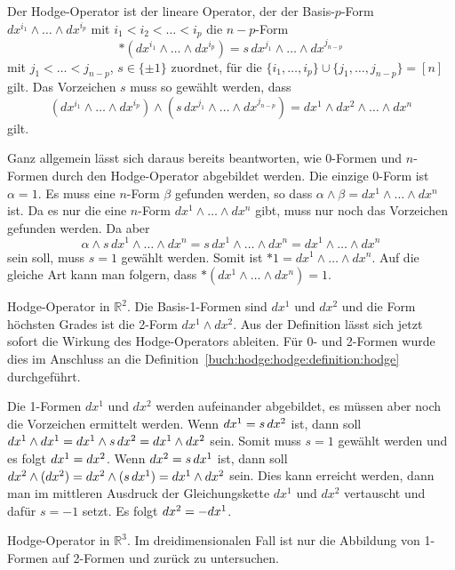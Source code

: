 \begin{definition}
\label{buch:hodge:hodge:definition:hodge}
Der Hodge-Operator ist der lineare Operator, der der
Basis-$p$-Form
$dx^{i_1}\wedge\dots\wedge dx^{i_p}$ mit $i_1<i_2<\dots<i_p$
die $n-p$-Form
\[
\ast(dx^{i_1}\wedge\dots\wedge dx^{i_p})
=
s\,dx^{j_1}\wedge\dots\wedge dx^{j_{n-p}}
\]
mit $j_1<\dots <j_{n-p}$, $s\in\{\pm1\}$ zuordnet, für die
$\{i_1,\dots,i_p\}\cup\{j_1,\dots,j_{n-p}\}=[n]$ gilt.
Das Vorzeichen $s$ muss so gewählt werden, dass
\[
(dx^{i_1}\wedge\dots\wedge dx^{i_p})
\wedge
(s\,dx^{j_1}\wedge\dots\wedge dx^{j_{n-p}})
=
dx^1\wedge dx^2\wedge\dots\wedge dx^n
\]
gilt.
\end{definition}

Ganz allgemein lässt sich daraus bereits beantworten, wie $0$-Formen und
$n$-Formen durch den Hodge-Operator abgebildet werden.
Die einzige 0-Form ist $\alpha=1$.
Es muss eine $n$-Form $\beta$ gefunden werden, so dass
$\alpha\wedge\beta=dx^1\wedge\dots\wedge dx^n$ ist.
Da es nur die eine $n$-Form $dx^1\wedge\dots\wedge dx^n$ gibt, muss
nur noch das Vorzeichen gefunden werden.
Da aber
\[
\alpha\wedge
s\,dx^1\wedge\dots\wedge dx^n
=
s\,dx^1\wedge\dots\wedge dx^n
=
dx^1\wedge\dots\wedge dx^n
\]
sein soll, muss $s=1$ gewählt werden.
Somit ist $\ast 1=dx^1\wedge\dots\wedge dx^n$.
Auf die gleiche Art kann man folgern, dass
$\ast(dx^1\wedge\dots\wedge dx^n)=1$.

\begin{beispiel}
Hodge-Operator in $\mathbb{R}^2$.
Die Basis-1-Formen sind $dx^1$ und $dx^2$ und die Form höchsten Grades ist
die 2-Form $dx^1\wedge dx^2$.
Aus der Definition lässt sich jetzt sofort die Wirkung des Hodge-Operators
ableiten.
Für 0- und 2-Formen wurde dies im Anschluss an die
Definition~\ref{buch:hodge:hodge:definition:hodge} durchgeführt.

Die 1-Formen $dx^1$ und $dx^2$ werden aufeinander abgebildet, es müssen
aber noch die Vorzeichen ermittelt werden.
Wenn $\*dx^1=s\,dx^2$ ist, dann soll
$dx^1\wedge \*dx^1=dx^1\wedge s\,dx^2=dx^1\wedge dx^2$ sein.
Somit muss $s=1$ gewählt werden und es folgt $\*dx^1=dx^2$.
Wenn $\*dx^2=s\,dx^1$ ist, dann soll
$dx^2\wedge(\*dx^2)=dx^2\wedge(s\,dx^1)=dx^1\wedge dx^2$ sein.
Dies kann erreicht werden, dann man im mittleren Ausdruck der
Gleichungskette $dx^1$ und $dx^2$ vertauscht und dafür $s=-1$ setzt.
Es folgt $\*dx^2=-dx^1$.
\end{beispiel}

\begin{beispiel}
\label{buch:hodge:hodge:beispiel:r3}
Hodge-Operator in $\mathbb{R}^3$.
Im dreidimensionalen Fall ist nur die Abbildung von 1-Formen auf
2-Formen und zurück zu untersuchen.
\end{beispiel}

